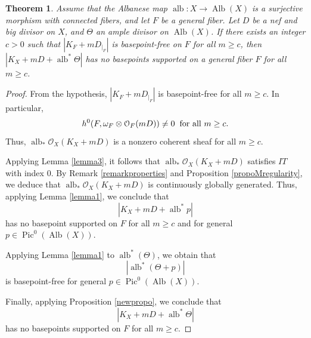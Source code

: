 \documentclass[sn-mathphys-num]{sn-jnl}%
\newtheorem{theorem}{Theorem}[section]
\theoremstyle{definition}
\numberwithin{equation}{section}
\begin{document}
\begin{theorem}\label{supplement3}
    Assume that the Albanese map $\operatorname{alb}: X \to \operatorname{Alb}(X)$ is a surjective morphism with connected fibers, and let $F$ be a general fiber. Let $D$ be a nef and big divisor on $X$, and $\Theta$ an ample divisor on $\operatorname{Alb}(X)$. If there exists an integer $c > 0$  such that $|K_{F} + mD_{|_{F}}|$ is basepoint-free on $F$ for all $m \geq c$, then $|K_{X} + mD + \operatorname{alb}^{*}\Theta|$ has no basepoints supported on a general fiber $F$ for all $m \geq c$. 
\end{theorem}
\begin{proof}
From the hypothesis, $|K_{F}+ mD_{|_{F}}|$ is basepoint-free for all $m \geq c$. In particular,
$$h^{0}(F, \omega_{F} \otimes \mathcal{O}_{F}(mD)) \neq 0 \hspace{0.2cm} \text{for all }  m \geq c \text{.}$$
Thus, $\operatorname{alb}_{*}\mathcal{O}_{X}(K_{X} +mD)$ is a nonzero coherent sheaf for all $m \geq c$. 
\par Applying Lemma \ref{lemma3}, it follows that  $\operatorname{alb}_{*}\mathcal{O}_{X}(K_{X} +mD)$ satisfies $IT$ with index $0$. By Remark \ref{remarkproperties} and Proposition \ref{propoMregularity}, we deduce that $\operatorname{alb}_{*}\mathcal{O}_{X}(K_{X} +mD)$ is continuously globally generated. Thus, applying Lemma \ref{lemma1}, we conclude that $$|K_{X} + mD + \operatorname{alb}^{*}p|$$ has no  basepoint supported on $F$ for all $m \geq c$ and for general $p \in \operatorname{Pic}^{0}(\operatorname{Alb}(X))$. 
\par Applying Lemma \ref{lemma1} to $\operatorname{alb}^{*}(\Theta)$, we obtain that $$|\operatorname{alb}^{*}(\Theta + p)|$$ is basepoint-free for general $p \in \operatorname{Pic}^{0}(\operatorname{Alb}(X))$. 
\par Finally, applying Proposition \ref{newpropo}, we conclude that
$$|K_{X} + mD + \operatorname{alb}^{*}\Theta|$$ has no  basepoints supported on $F$ for all $m \geq c$.
\end{proof}
\end{document}
